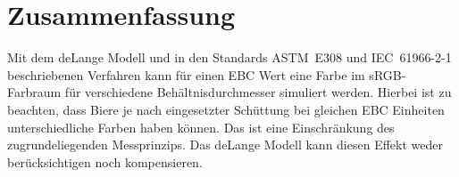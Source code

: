 \documentclass[10pt,a4paper,DIV=12,parskip=half]{scrarticle}
\begin{document}
\section*{Zusammenfassung}

Mit dem deLange Modell und in den Standards ASTM~E308 und IEC~61966-2-1 beschriebenen Verfahren kann für einen EBC Wert eine Farbe im sRGB-Farbraum für verschiedene Behältnisdurchmesser simuliert werden. Hierbei ist zu beachten, dass Biere je nach eingesetzter Schüttung bei gleichen EBC Einheiten unterschiedliche Farben haben können. Das ist eine Einschränkung des zugrundeliegenden Messprinzips. Das deLange Modell kann diesen Effekt weder berücksichtigen noch kompensieren.

\printbibliography[title=Quellen]
\end{document}
